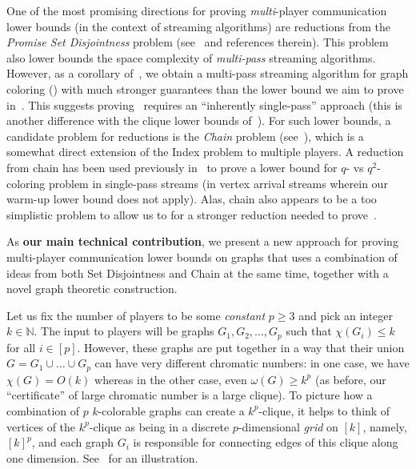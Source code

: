 \documentclass[11pt]{article}
\theoremstyle{definition}
\renewcommand{\leq}{\leqslant}
\renewcommand{\geq}{\geqslant}
\newcommand{\IN}{\ensuremath{\mathbb{N}}}
\begin{document}
One of the most promising directions for proving \emph{multi}-player communication lower bounds (in the context of streaming algorithms) are reductions from the \emph{Promise Set Disjointness} problem (see~\cite{KamathPW21} and references therein). 
This problem also lower bounds the space complexity of \emph{multi-pass} streaming algorithms. 
However, as a corollary of~, we obtain a multi-pass streaming algorithm for graph coloring () with much stronger guarantees than the lower bound we aim to prove in~. This suggests
proving~ requires an ``inherently single-pass'' approach (this is another difference with the clique lower bounds of~\cite{HalldorssonSSW12,RashtchianW0Z21}). For such lower bounds, a candidate problem for reductions is the \emph{Chain} problem 
(see~\cite{Chakrabarti07,CormodeDK19,FeldmanNSZ20,Sundaresan25}), which is a somewhat direct
extension of the Index problem to multiple players. A reduction from chain has been used previously in~\cite{CormodeDK19} to prove a lower bound for $q$- vs $q^2$-coloring problem in single-pass streams (in vertex
arrival streams wherein our warm-up lower bound does not apply). Alas, chain also appears to be a too simplistic problem to allow us to for a stronger reduction 
needed to prove~. 

As \textbf{our main technical contribution}, we present a new approach for proving multi-player communication lower bounds on graphs that uses a combination of ideas from both Set Disjointness and Chain at the same time, 
together with a novel graph theoretic construction. 

Let us fix the number of players to be some \emph{constant} $p \geq 3$ and pick an integer $k \in \IN$. The input to players will be graphs $G_1,G_2,\ldots,G_p$ such that $\chi(G_i) \leq k$ for all $i \in [p]$. However, 
these graphs are put together in a way that their union $G=G_1 \cup \ldots \cup G_p$ can have very different chromatic numbers: in one case, we have $\chi(G) = O(k)$ whereas in the other case, even $\omega(G) \geq k^p$ (as before, 
our ``certificate'' of large chromatic number is a large clique). To picture how a combination of $p$ $k$-colorable graphs can create a $k^p$-clique, it helps to think of vertices of the $k^p$-clique as being in a discrete $p$-dimensional \emph{grid} on $[k]$, namely, $[k]^p$,
and each graph $G_i$ is responsible for connecting edges of this clique along one dimension. See~ for an illustration. 
\end{document}
